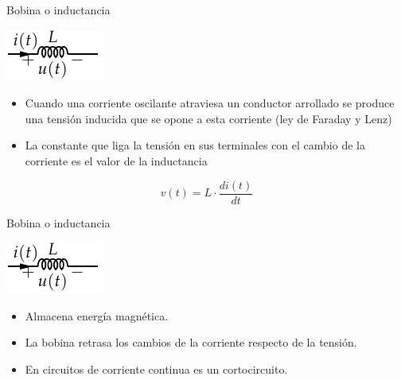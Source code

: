\documentclass[xcolor={usenames,svgnames,dvipsnames}]{beamer}
\begin{document}
\begin{frame}[label={sec:org0dc51ad}]{Bobina o inductancia}
\begin{center}
\includegraphics[height=0.2\textheight]{../figs/Bobina.pdf}
\end{center}


\begin{itemize}
\item Cuando una corriente oscilante atraviesa un conductor arrollado se
produce una \alert{tensión inducida que se opone a esta corriente} (ley de
Faraday y Lenz)

\item La constante que liga la tensión en sus terminales con el cambio de
la corriente es el valor de la inductancia
\end{itemize}

\[
v(t)=L\cdot\frac{di(t)}{dt}
\]
\end{frame}

\begin{frame}[label={sec:org547bbf2}]{Bobina o inductancia}
\begin{center}
\includegraphics[height=0.2\textheight]{../figs/Bobina.pdf}
\end{center}


\begin{itemize}
\item Almacena \alert{energía magnética}.

\item La bobina \alert{retrasa los cambios de la corriente} respecto de la
tensión.

\item En circuitos de corriente continua es un cortocircuito.
\end{itemize}
\end{frame}
\end{document}
